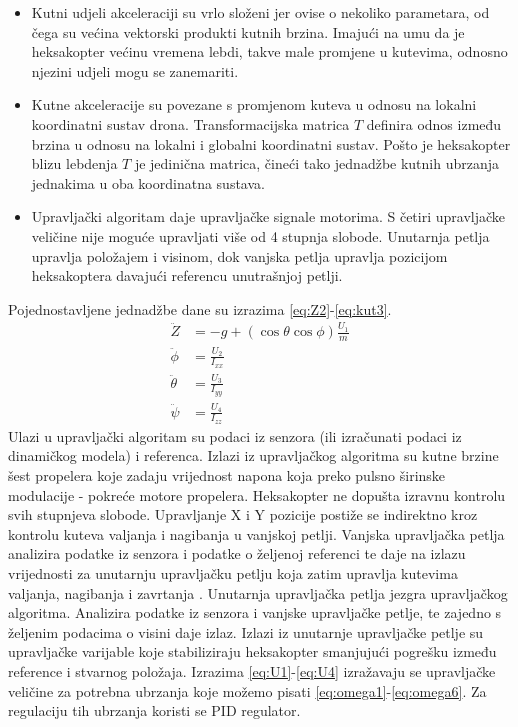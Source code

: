 \documentclass[times, utf8, diplomski]{fer}
\begin{document}
\begin{itemize}
\item Kutni udjeli akceleraciji su vrlo složeni jer ovise o nekoliko parametara, od čega su većina vektorski produkti kutnih brzina. Imajući na umu da je heksakopter većinu vremena lebdi, takve male promjene u kutevima, odnosno njezini udjeli mogu se zanemariti.
\item Kutne akceleracije su povezane s promjenom kuteva u odnosu na lokalni koordinatni sustav drona. Transformacijska matrica $T$ definira odnos između brzina u odnosu na lokalni i globalni koordinatni sustav. Pošto je heksakopter blizu lebdenja $T$ je jedinična matrica, čineći tako jednadžbe kutnih ubrzanja jednakima u oba koordinatna sustava. 
\item Upravljački algoritam daje upravljačke signale motorima. S četiri upravljačke veličine nije moguće upravljati više od 4 stupnja slobode. Unutarnja petlja upravlja položajem i visinom, dok vanjska petlja upravlja pozicijom heksakoptera davajući referencu unutrašnjoj petlji.
\end{itemize}
Pojednostavljene jednadžbe dane su izrazima \ref{eq:Z2}-\ref{eq:kut3}.
\begin{align}
\ddot{Z} &= -g + (\cos\theta \cos\phi)\frac{U_1}{m} \label{eq:Z2} \\
\ddot{\phi} &= \frac{U_2}{I_{xx}} \label{eq:kut1} \\
\ddot{\theta} &= \frac{U_3}{I_{yy}} \label{eq:kut2} \\
\ddot{\psi} &= \frac{U_4}{I_{zz}} \label{eq:kut3} 
\end{align}
Ulazi u upravljački algoritam su podaci iz senzora (ili izračunati podaci iz dinamičkog modela) i referenca. Izlazi iz upravljačkog algoritma su kutne brzine šest propelera koje zadaju vrijednost napona koja preko pulsno širinske modulacije -  pokreće motore propelera. Heksakopter ne dopušta izravnu kontrolu svih stupnjeva slobode. Upravljanje X i Y pozicije postiže se indirektno kroz kontrolu kuteva valjanja  i nagibanja  u vanjskoj petlji. 
Vanjska upravljačka petlja analizira podatke iz senzora i podatke o željenoj referenci te daje na izlazu vrijednosti za unutarnju upravljačku petlju koja zatim upravlja kutevima valjanja, nagibanja 
i zavrtanja . Unutarnja upravljačka petlja jezgra upravljačkog algoritma. Analizira podatke iz senzora i vanjske upravljačke petlje, te zajedno s željenim podacima o visini daje izlaz. Izlazi iz unutarnje upravljačke petlje su upravljačke varijable koje stabiliziraju heksakopter smanjujući pogrešku između reference i stvarnog položaja. Izrazima \ref{eq:U1}-\ref{eq:U4} izražavaju se upravljačke veličine za potrebna ubrzanja koje možemo pisati \ref{eq:omega1}-\ref{eq:omega6}. Za regulaciju tih ubrzanja koristi se PID regulator.
\end{document}
